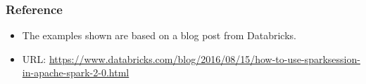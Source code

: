 \begin{frame}
    \frametitle{Reference}
    \begin{itemize}
        \item The examples shown are based on a blog post from Databricks.
        \item URL: \url{https://www.databricks.com/blog/2016/08/15/how-to-use-sparksession-in-apache-spark-2-0.html}
    \end{itemize}
\end{frame}
%
%
%
%
%
%
%

